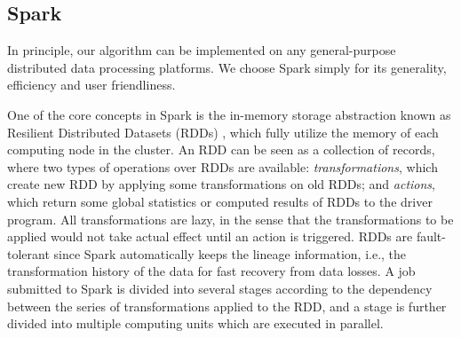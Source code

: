 \documentclass[conference]{IEEEtran}
\theoremstyle{definition}
\theoremstyle{definition}
\begin{document}
\subsection{Spark}
In  principle, our algorithm can be implemented on  any general-purpose distributed data processing platforms.  
We choose  Spark \cite{zaharia2012resilient} simply for its generality, efficiency and user friendliness.
\iffalse
1) it is one of the most popular general-purpose distributed data flow framework for large-scale data processing nowadays; 
2) it fully facilitates in-memory cluster computing, which provides much better performance and fault-tolerance than other platforms, especially when dealing with iterative algorithms; 
3) it provides rich and user-friendly programming interfaces, which enable users to focus on building their applications at fast speed. %
\fi
One of the core concepts in Spark is the in-memory storage abstraction known as  Resilient  Distributed  Datasets  (RDDs)  \cite{zaharia2012resilient}, which  fully utilize the memory of each computing node in the cluster. 
An RDD  can be seen as a collection of  records,  where  two  types  of  operations  over  RDDs  are available:
 \emph{transformations}, which create new RDD by applying some transformations on  old RDDs; and  \emph{actions}, which return some global statistics  or computed results of RDDs to the driver program.
All transformations are lazy, in the sense that the transformations to be applied would not take actual effect until an action is triggered. 
RDDs are fault-tolerant since Spark  automatically  keeps the lineage information,  i.e., the transformation history of the data for fast recovery from data losses.  
A job submitted to  Spark  is divided into several stages according to the dependency between the series of transformations applied to the RDD, and a stage is further divided into multiple computing units which are executed in parallel. 
\end{document}
